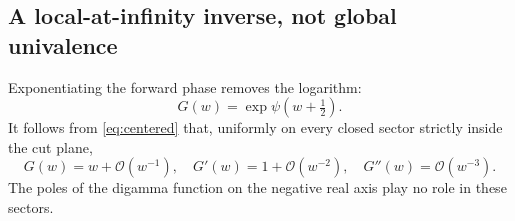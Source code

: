 \documentclass[11pt,a4paper]{article}
\theoremstyle{definition}
\numberwithin{equation}{section}
\newcommand{\Oh}{\mathcal O}
\begin{document}
\subsection{A local-at-infinity inverse, not global univalence}
Exponentiating the forward phase removes the logarithm:
\begin{equation}
 G(w)=\exp\psi(w+\tfrac12).
 \label{eq:G}
\end{equation}
It follows from \eqref{eq:centered} that, uniformly on every closed
sector strictly inside the cut plane,
\begin{equation}
 G(w)=w+\Oh(w^{-1}),\quad G'(w)=1+\Oh(w^{-2}),\quad
 G''(w)=\Oh(w^{-3}).
 \label{eq:Gnear}
\end{equation}
The poles of the digamma function on the negative real axis play no role
in these sectors.
\end{document}
